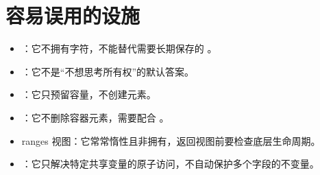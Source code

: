 \section{容易误用的设施}

\begin{itemize}
  \item {}：它不拥有字符，不能替代需要长期保存的 。
  \item {}：它不是“不想思考所有权”的默认答案。
  \item {}：它只预留容量，不创建元素。
  \item {}：它不删除容器元素，需要配合 。
  \item ranges 视图：它常常惰性且非拥有，返回视图前要检查底层生命周期。
  \item {}：它只解决特定共享变量的原子访问，不自动保护多个字段的不变量。
\end{itemize}

